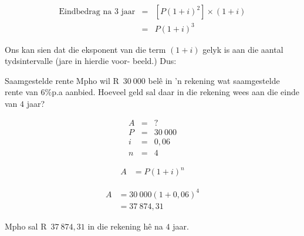\begin{eqnarray*}
    \mbox{Eindbedrag na 3 jaar} &=& [P(1 + i)^2] \times (1 + i)\\
    &=& P(1 + i)^3
\end{eqnarray*}

Ons kan sien dat die eksponent van die term $(1 + i)$ gelyk is aan die aantal tydsintervalle (jare in hierdie voor-
beeld.) Dus:




\begin{wex}{Saamgestelde rente}{
    Mpho wil R~$30~000$ bel\^e in 'n rekening wat saamgestelde rente van $6\%$p.a aanbied. Hoeveel geld sal daar in die rekening wees aan die einde van $4$ jaar?}{
    
    \begin{eqnarray*}
	A &=& ?\\
	P &=& 30~000\\
	i &=& 0,06\\
	n &=& 4
    \end{eqnarray*}

    \begin{align*}
	A &= P(1 + i)^n
    \end{align*}

    \begin{align*}
	A &= 30~000(1 + 0,06)^4\\
	  &= 37~874,31
    \end{align*}

    Mpho sal R~$37~874,31$ in die rekening h\^e na $4$ jaar.
    }
\end{wex}


